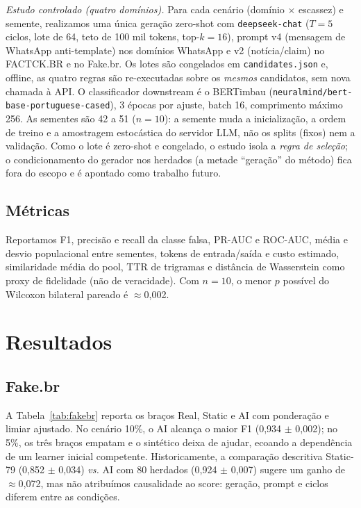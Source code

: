 \documentclass[conference]{IEEEtran}
\begin{document}
\emph{Estudo controlado (quatro dom\'inios).} Para cada cen\'ario (dom\'inio $\times$ escassez) e semente, realizamos uma \'unica gera\c{c}\~ao zero-shot com \texttt{deepseek-chat} ($T{=}5$ ciclos, lote de 64, teto de 100 mil tokens, top-$k{=}16$), prompt v4 (mensagem de WhatsApp anti-template) nos dom\'inios WhatsApp e v2 (not\'icia/claim) no FACTCK.BR e no Fake.br. Os lotes s\~ao congelados em \texttt{candidates.json} e, offline, as quatro regras s\~ao re-executadas sobre os \emph{mesmos} candidatos, sem nova chamada \`a API. O classificador downstream \'e o BERTimbau \cite{souza2020bertimbau} (\texttt{neuralmind/bert-base-portuguese-cased}), 3 \'epocas por ajuste, batch 16, comprimento m\'aximo 256. As sementes s\~ao 42 a 51 ($n{=}10$): a semente muda a inicializa\c{c}\~ao, a ordem de treino e a amostragem estoc\'astica do servidor LLM, n\~ao os splits (fixos) nem a valida\c{c}\~ao. Como o lote \'e zero-shot e congelado, o estudo isola a \emph{regra de sele\c{c}\~ao}; o condicionamento do gerador nos herdados (a metade ``gera\c{c}\~ao'' do m\'etodo) fica fora do escopo e \'e apontado como trabalho futuro.

\subsection{M\'etricas}

Reportamos F1, precis\~ao e recall da classe falsa, PR-AUC e ROC-AUC, m\'edia e desvio populacional entre sementes, tokens de entrada/sa\'ida e custo estimado, similaridade m\'edia do pool, TTR de trigramas e dist\^ancia de Wasserstein como proxy de fidelidade (n\~ao de veracidade). Com $n{=}10$, o menor $p$ poss\'ivel do Wilcoxon bilateral pareado \'e $\approx$0{,}002.

\section{Resultados}

\subsection{Fake.br}

A Tabela~\ref{tab:fakebr} reporta os bra\c{c}os Real, Static e AI com pondera\c{c}\~ao e limiar ajustado. No cen\'ario 10\%, o AI alcan\c{c}a o maior F1 (0{,}934 $\pm$ 0{,}002); no 5\%, os tr\^es bra\c{c}os empatam e o sint\'etico deixa de ajudar, ecoando a depend\^encia de um learner inicial competente. Historicamente, a compara\c{c}\~ao descritiva Static-79 (0{,}852 $\pm$ 0{,}034) \emph{vs.} AI com 80 herdados (0{,}924 $\pm$ 0{,}007) sugere um ganho de $\approx$0{,}072, mas n\~ao atribu\'imos causalidade ao score: gera\c{c}\~ao, prompt e ciclos diferem entre as condi\c{c}\~oes.
\end{document}
